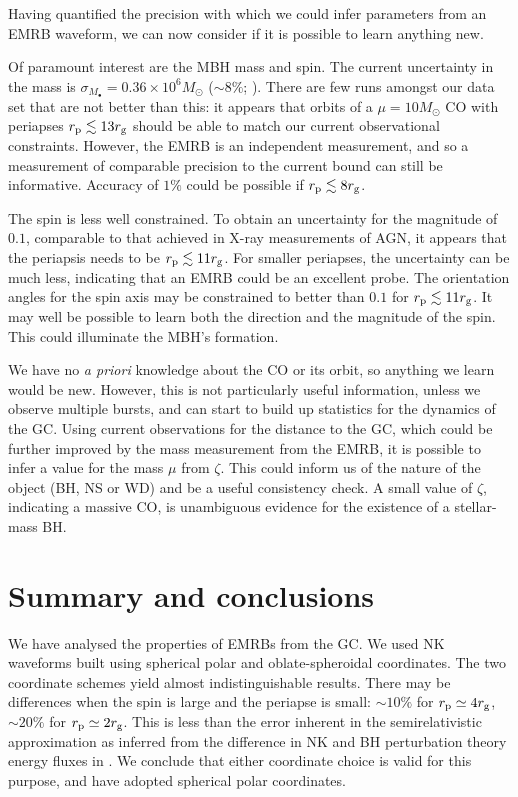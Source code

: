 Having quantified the precision with which we could infer parameters from an EMRB waveform, we can now consider if it is possible to learn anything new.

Of paramount interest are the MBH mass and spin. The current uncertainty in the mass is $\sigma_{M_\bullet} = 0.36 \times 10^6 M_\odot$ ($\sim 8\%$; \citealt{Gillessen2009}). There are few runs amongst our data set that are not better than this: it appears that orbits of a $\mu = 10 M_\odot$ CO with periapses $r_\mathrm{p} \lesssim 13 r_\mathrm{g}$ should be able to match our current observational constraints. However, the EMRB is an independent measurement, and so a measurement of comparable precision to the current bound can still be informative. Accuracy of $1\%$ could be possible if $r_\mathrm{p} \lesssim 8 r_\mathrm{g}$.

The spin is less well constrained. To obtain an uncertainty for the magnitude of $0.1$, comparable to that achieved in X-ray measurements of AGN, it appears that the periapsis needs to be $r_\mathrm{p} \lesssim 11 r_\mathrm{g}$. For smaller periapses, the uncertainty can be much less, indicating that an EMRB could be an excellent probe. The orientation angles for the spin axis may be constrained to better than $0.1$ for $r_\mathrm{p} \lesssim 11 r_\mathrm{g}$. It may well be possible to learn both the direction and the magnitude of the spin. This could illuminate the MBH's formation.

We have no {\it a priori} knowledge about the CO or its orbit, so anything we learn would be new. However, this is not particularly useful information, unless we observe multiple bursts, and can start to build up statistics for the dynamics of the GC. Using current observations for the distance to the GC, which could be further improved by the mass measurement from the EMRB, it is possible to infer a value for the mass $\mu$ from $\zeta$. This could inform us of the nature of the object (BH, NS or WD) and be a useful consistency check. A small value of $\zeta$, indicating a massive CO, is unambiguous evidence for the existence of a stellar-mass BH.

\section{Summary and conclusions}

We have analysed the properties of EMRBs from the GC. We used NK waveforms built using spherical polar and oblate-spheroidal coordinates. The two coordinate schemes yield almost indistinguishable results. There may be differences when the spin is large and the periapse is small: $\sim 10\%$ for $r_\mathrm{p} \simeq 4 r_\mathrm{g}$, $\sim 20\%$ for $r_\mathrm{p} \simeq 2 r_\mathrm{g}$. This is less than the error inherent in the semirelativistic approximation as inferred from the difference in NK and BH perturbation theory energy fluxes in . We conclude that either coordinate choice is valid for this purpose, and have adopted spherical polar coordinates.

